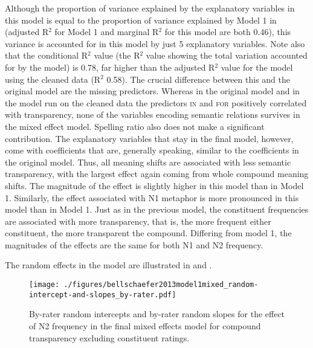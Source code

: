 Although the proportion of variance explained by the explanatory
variables in this model is equal to the proportion of variance
explained by Model 1 in \citet{BellandSchaefer:2013} (adjusted R$^2$
for Model 1 and marginal R$^2$ for this model are both 0.46),
this variance is accounted for in this model by just 5 explanatory variables. Note also that the
conditional R$^2$ value (the R$^2$ value showing the total variation
accounted for by the model) is  0.78, far higher than the adjusted R$^2$ value
for the model using the cleaned data (R$^2$ 0.58). The crucial difference
between this and the original model are the missing
predictors. Whereas in the original model and in the
model run on the cleaned data the predictors \textsc{in} and \textsc{for} positively
correlated with transparency, none of
the variables encoding semantic relations survives in the mixed effect
model. Spelling ratio also does not make a significant
contribution. The explanatory
variables that stay in the final model, however, come with
coefficients that are, generally speaking, similar to the coefficients in the original model. Thus, all meaning shifts are
associated with less semantic transparency, with the largest effect
again coming from whole compound meaning shifts. The magnitude of the
effect is slightly higher in this model than in Model 1. Similarly,
the effect associated with N1 metaphor is more pronounced in this
model than in Model 1. Just as in the previous model, the constituent frequencies are
associated with more transparency, that is, the more frequent either
constituent, the more transparent the compound. Differing from model
1, the magnitudes of the effects are the same for both N1 and N2 frequency.

The random effects in the model are illustrated in  and .
\begin{figure}[!htb]
  \centering
\texttt{[image: ./figures/bellschaefer2013model1mixed\_random-intercept-and-slopes\_by-rater.pdf]}
  \caption{By-rater random intercepts and by-rater random slopes for the effect of N2 frequency in the final mixed effects model for compound transparency excluding constituent ratings.}
\label{fig:bellschaefer2013_model_1-mixed-effects_random-effects-by-rater}
\end{figure}

